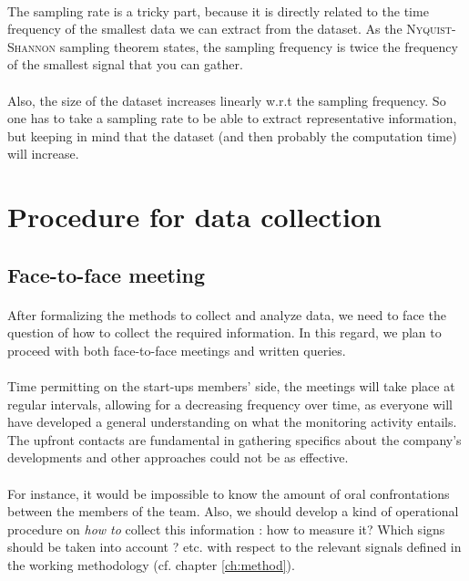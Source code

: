 \documentclass[twoside]{report}
\begin{document}
	\paragraph{}
	The sampling rate is a tricky part, because it is directly related to the time frequency of the smallest data we can extract from the dataset. As the \textsc{Nyquist}-\textsc{Shannon} sampling theorem states, the sampling frequency is twice the frequency of the smallest signal that you can gather.
	\paragraph{}
	Also, the size of the dataset increases linearly w.r.t the sampling frequency. So one has to take a sampling rate to be able to extract representative information, but keeping in mind that the dataset (and then probably the computation time) will increase.
	\section{Procedure for data collection}
	\subsection{Face-to-face meeting}
	\paragraph{}
	After formalizing the methods to collect and analyze data, we need to face the question of how to collect the required information. In this regard, we plan to proceed with both face-to-face meetings and written queries. 
	\paragraph{}
	Time permitting on the start-ups members’ side, the meetings will take place at regular intervals, allowing for a decreasing frequency over time, as everyone will have developed a general understanding on what the monitoring activity entails. The upfront contacts are fundamental in gathering specifics about the company’s developments and other approaches could not be as effective.
	\paragraph{}
	For instance, it would be impossible to know the amount of oral confrontations between the members of the team. Also, we should develop a kind of operational procedure on \emph{how to} collect this information : how to measure it? Which signs should be taken into account ? etc. with respect to the relevant signals defined in the working methodology (cf. chapter \ref{ch:method}).
\end{document}
